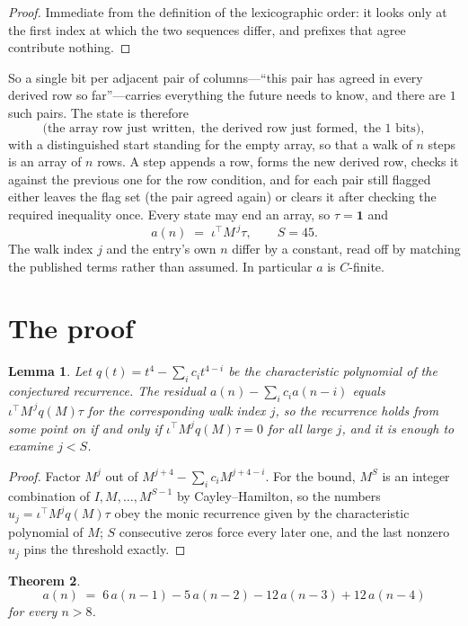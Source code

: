 \documentclass[11pt,a4paper]{article}
\theoremstyle{plain}
\newtheorem{theorem}{Theorem}
\newtheorem{lemma}[theorem]{Lemma}
\theoremstyle{definition}
\begin{document}
\begin{proof}
Immediate from the definition of the lexicographic order: it looks only at the first index at
which the two sequences differ, and prefixes that agree contribute nothing.
\end{proof}

So a single bit per adjacent pair of columns---``this pair has agreed in every derived row so
far''---carries everything the future needs to know, and there are $1$ such pairs. The state
is therefore
\[
\bigl(\text{the array row just written},\; \text{the derived row just formed},\;
\text{the 1 bits}\bigr),
\]
with a distinguished start standing for the empty array, so that a walk of $n$ steps is an array
of $n$ rows. A step appends a row, forms the new derived row, checks it against the previous one
for the row condition, and for each pair still flagged either leaves the flag set (the pair
agreed again) or clears it after checking the required inequality once. Every state may end an
array, so $\tau=\mathbf{1}$ and
\[
a(n)\;=\;\iota^{\!\top}M^{\,j}\tau ,\qquad S=45.
\]
The walk index $j$ and the entry's own $n$ differ by a constant, read off by matching the
published terms rather than assumed. In particular $a$ is $C$-finite.

\section{The proof}

\begin{lemma}\label{lem:crit}
Let $q(t)=t^{4}-\sum_i c_it^{4-i}$ be the characteristic polynomial of the
conjectured recurrence. The residual $a(n)-\sum_ic_ia(n-i)$ equals
$\iota^{\!\top}M^{\,j}q(M)\tau$ for the corresponding walk index $j$, so the recurrence
holds from some point on if and only if $\iota^{\!\top}M^{j}q(M)\tau=0$ for all large $j$,
and it is enough to examine $j<S$.
\end{lemma}

\begin{proof}
Factor $M^{j}$ out of $M^{j+4}-\sum_ic_iM^{j+4-i}$. For the bound, $M^{S}$
is an integer combination of $I,M,\dots,M^{S-1}$ by Cayley--Hamilton, so the numbers
$u_j=\iota^{\!\top}M^{j}q(M)\tau$ obey the monic recurrence given by the characteristic
polynomial of $M$; $S$ consecutive zeros force every later one, and the last nonzero $u_j$
pins the threshold exactly.
\end{proof}

\begin{theorem}
\[
a(n)\;=\;6\,a(n-1) - 5\,a(n-2) - 12\,a(n-3) + 12\,a(n-4)
\]
for every $n>8$.
\end{theorem}
\end{document}
